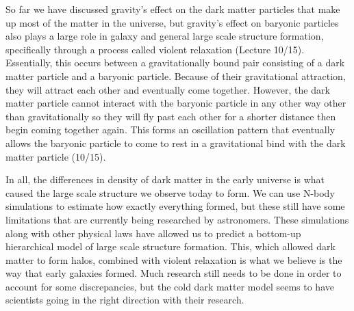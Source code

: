 \documentclass[12pt]{article}
\begin{document}
So far we have discussed gravity's effect on the dark matter particles that make
up most of the matter in the universe, but gravity's effect on baryonic
particles also plays a large role in galaxy and general large scale structure
formation, specifically through a process called violent relaxation (Lecture
10/15).
Essentially, this occurs between a gravitationally bound pair consisting of a
dark matter particle and a baryonic particle.  Because of their gravitational
attraction, they will attract each other and eventually come together.  However,
the dark matter particle cannot interact with the baryonic particle in any other
way other than gravitationally so they will fly past each other for a shorter
distance then begin coming together again.  This forms an oscillation pattern
that eventually allows the baryonic particle to come to rest in a gravitational
bind with the dark matter particle (10/15).

In all, the differences in density of dark matter in the early universe is what
caused the large scale structure we observe today to form.  We can use N-body
simulations to estimate how exactly everything formed, but these still have some
limitations that are currently being researched by astronomers.  These
simulations along with other physical laws have allowed us to predict a
bottom-up hierarchical model of large scale structure formation.  This, which
allowed dark matter to form halos, combined with violent relaxation is what we
believe is the way that early galaxies formed.  Much research still needs to be
done in order to account for some discrepancies, but the cold dark matter model
seems to have scientists going in the right direction with their research.
\end{document}
